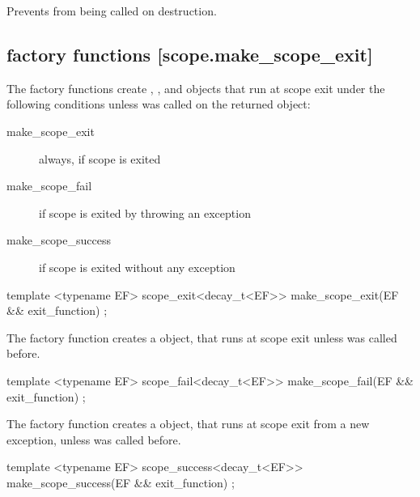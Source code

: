 \documentclass[ebook,11pt,article]{memoir}
\begin{document}
\begin{itemdescr}
\pnum
Prevents  from being called on destruction.
\end{itemdescr}


\subsection { factory functions [scope.make_scope_exit]}
\pnum
The factory functions create , , and  objects that run  at scope exit  under the following conditions unless  was called on the returned object:
\begin{description}
\item[make_scope_exit ] always, if scope is exited
\item[make_scope_fail ] if scope is exited by throwing an exception
\item[make_scope_success ] if scope is exited without any exception
\end{description}

\begin{itemdecl}
template <typename EF>
scope_exit<decay_t<EF>> make_scope_exit(EF && exit_function) ;
\end{itemdecl}

\begin{itemdescr}
\pnum
The factory function creates a  object, that runs  at scope exit unless  was called before.

\end{itemdescr}

\begin{itemdecl}
template <typename EF>
scope_fail<decay_t<EF>> make_scope_fail(EF && exit_function) ;
\end{itemdecl}

\begin{itemdescr}
\pnum
The factory function creates a  object, that runs  at scope exit from a new exception, unless  was called before.

\end{itemdescr}
\begin{itemdecl}
template <typename EF>
scope_success<decay_t<EF>> make_scope_success(EF && exit_function) ;
\end{itemdecl}
\end{document}
